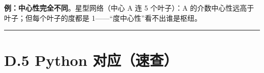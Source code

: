 \begin{Shaded}
\begin{Highlighting}[]
\OperatorTok{=}
\NormalTok{G.add\_weighted\_edges\_from([(}\NormalTok{,}\NormalTok{,}\NormalTok{), (}\NormalTok{,}\NormalTok{,}\NormalTok{), (}\NormalTok{,}\NormalTok{,}\NormalTok{), (}\NormalTok{,}\NormalTok{,}\NormalTok{)])}
\NormalTok{, }\OperatorTok{=}\NormalTok{))          }
\NormalTok{, }\OperatorTok{=}\NormalTok{))   }
\end{Highlighting}
\end{Shaded}

\textbf{例：中心性完全不同}。星型网络（中心 A 连 5 个叶子）：A
的介数中心性远高于叶子；但每个叶子的度都是
1------``度中心性''看不出谁是枢纽。

\begin{center}\rule{0.5\linewidth}{0.5pt}\end{center}

\section{D.5 Python
对应（速查）}\label{d.5-python-ux5bf9ux5e94ux901fux67e5}

